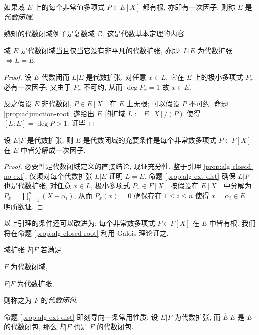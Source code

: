 \begin{definition}
	如果域 $E$ 上的每个非常值多项式 $P \in E[X]$ 都有根, 亦即有一次因子, 则称 $E$ 是\emph{代数闭域}.
\end{definition}
熟知的代数闭域例子是复数域 $\mathbb{C}$, 这是代数基本定理的内容.

\begin{lemma}\label{prop:alg-closed-no-ext}
	域 $E$ 是代数闭域当且仅当它没有非平凡的代数扩张, 亦即: $L|E$ 为代数扩张 $\iff L=E$.
\end{lemma}
\begin{proof}
	设 $E$ 代数闭而 $L|E$ 是代数扩张, 对任意 $x \in L$, 它在 $E$ 上的极小多项式 $P_x$ 必有一次因子; 又由于 $P_x$ 不可约, 从而 $\deg P_x = 1$ 故 $x \in E$.
	
	反之假设 $E$ 非代数闭, $P \in E[X]$ 在 $E$ 上无根; 可以假设 $P$ 不可约, 命题 \ref{prop:adjunction-root} 遂给出 $E$ 的扩域 $L := E[X]/(P)$ 使得 $[L:E] = \deg P > 1$. 证毕
\end{proof}

\begin{lemma}\label{prop:alg-closed-decomp}
	设 $E|F$ 是代数扩张, 则 $E$ 是代数闭域的充要条件是每个非常数多项式 $P \in F[X]$ 在 $E$ 中皆分解成一次因子.
\end{lemma}
\begin{proof}
	必要性是代数闭域定义的直接结论, 现证充分性. 鉴于引理 \ref{prop:alg-closed-no-ext}, 仅须对每个代数扩张 $L|E$ 证明 $L=E$. 命题 \ref{prop:alg-ext-dist} 确保 $L|F$ 也是代数扩张, 对任意 $x \in L$, 极小多项式 $P_x \in F[X]$ 按假设在 $E[X]$ 中分解为 $P_x = \prod_{i=1}^n (X - \alpha_i)$, 从而 $P_x(x)=0$ 确保存在 $1 \leq i \leq n$ 使得 $x = \alpha_i \in E$. 明所欲证.
\end{proof}
以上引理的条件还可以改进为: 每个非常数多项式 $P \in F[X]$ 在 $E$ 中皆有根. 我们将在命题 \ref{prop:alg-closed-root} 利用 Galois 理论证之.

\begin{definition}
	域扩张 $\overline{F}|F$ 若满足
	\begin{inparaenum}[(i)]
		\item $\overline{F}$ 为代数闭域,
		\item $\overline{F}|F$ 为代数扩张,
	\end{inparaenum}
	则称之为 $F$ 的\emph{代数闭包}.
\end{definition}
命题 \ref{prop:alg-ext-dist} 即刻导向一条常用性质: 设 $E|F$ 为代数扩张, 而 $\overline{E}|E$ 是 $E$ 的代数闭包, 那么 $\overline{E}|F$ 也是 $F$ 的代数闭包.

